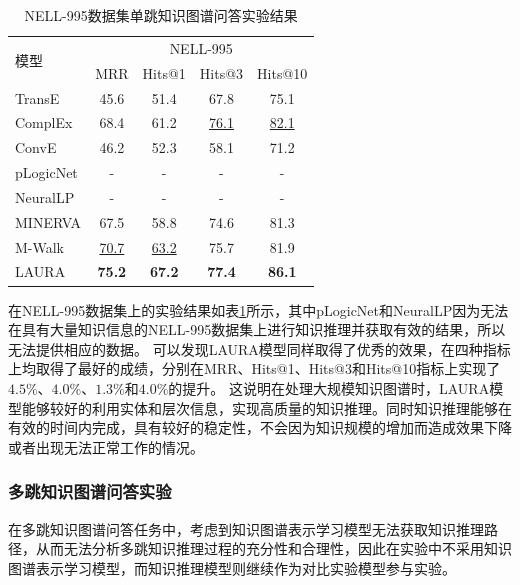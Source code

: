 \documentclass[algorithmlist, AutoFakeBold, AutoFakeSlant, figurelist, tablelist, nomlist, engineering]{seuthesix}
\begin{document}
\begin{table}[t]
  \centering
  \caption{NELL-995数据集单跳知识图谱问答实验结果}
  \begin{tabular*}{0.95\textwidth}{@{\extracolsep{\fill}}lcccc}
    \toprule[1pt]
    \multirow{2}{*}{模型} & \multicolumn{4}{c}{NELL-995} \\
      & MRR & Hits@1 & Hits@3 & Hits@10 \\ \hline
    TransE & 45.6 & 51.4 & 67.8 & 75.1 \\
    ComplEx & 68.4 & 61.2 & \underline{76.1} & \underline{82.1} \\
    ConvE & 46.2 & 52.3 & 58.1 & 71.2 \\
    pLogicNet & - & - & - & - \\
    NeuralLP & - & - & - & - \\
    MINERVA & 67.5 & 58.8 & 74.6 & 81.3 \\
    M-Walk & \underline{70.7} & \underline{63.2} & 75.7 & 81.9 \\
    LAURA & \textbf{75.2} & \textbf{67.2} & \textbf{77.4} & \textbf{86.1} \\
    \bottomrule[1pt]
  \end{tabular*}
  \label{Experiment2_NELL-995}
\end{table}

在NELL-995数据集上的实验结果如表\ref{Experiment2_NELL-995}所示，其中pLogicNet和NeuralLP因为无法在具有大量知识信息的NELL-995数据集上进行知识推理并获取有效的结果，所以无法提供相应的数据。
可以发现LAURA模型同样取得了优秀的效果，在四种指标上均取得了最好的成绩，分别在MRR、Hits@1、Hits@3和Hits@10指标上实现了$4.5\%$、$4.0\%$、$1.3\%$和$4.0\%$的提升。
这说明在处理大规模知识图谱时，LAURA模型能够较好的利用实体和层次信息，实现高质量的知识推理。同时知识推理能够在有效的时间内完成，具有较好的稳定性，不会因为知识规模的增加而造成效果下降或者出现无法正常工作的情况。

\subsubsection{多跳知识图谱问答实验}
在多跳知识图谱问答任务中，考虑到知识图谱表示学习模型无法获取知识推理路径，从而无法分析多跳知识推理过程的充分性和合理性，因此在实验中不采用知识图谱表示学习模型，而知识推理模型则继续作为对比实验模型参与实验。
\end{document}
